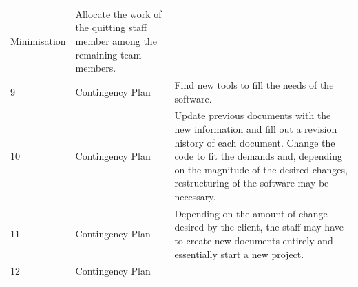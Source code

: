 \documentclass[]{article}
\begin{document}
\begin{longtable}[c]{@{}lll@{}}
\begin{minipage}[t]{0.30\columnwidth}
Minimisation
\end{minipage} & \begin{minipage}[t]{0.30\columnwidth}\raggedright
Allocate the work of the quitting staff member among the remaining team
members.
\end{minipage}
\\\addlinespace
\begin{minipage}[t]{0.30\columnwidth}\raggedright
9
\end{minipage} & \begin{minipage}[t]{0.30\columnwidth}\raggedright
Contingency Plan
\end{minipage} & \begin{minipage}[t]{0.30\columnwidth}\raggedright
Find new tools to fill the needs of the software.
\end{minipage}
\\\addlinespace
\begin{minipage}[t]{0.30\columnwidth}\raggedright
10
\end{minipage} & \begin{minipage}[t]{0.30\columnwidth}\raggedright
Contingency Plan
\end{minipage} & \begin{minipage}[t]{0.30\columnwidth}\raggedright
Update previous documents with the new information and fill out a
revision history of each document. Change the code to fit the demands
and, depending on the magnitude of the desired changes, restructuring of
the software may be necessary.
\end{minipage}
\\\addlinespace
\begin{minipage}[t]{0.30\columnwidth}\raggedright
11
\end{minipage} & \begin{minipage}[t]{0.30\columnwidth}\raggedright
Contingency Plan
\end{minipage} & \begin{minipage}[t]{0.30\columnwidth}\raggedright
Depending on the amount of change desired by the client, the staff may
have to create new documents entirely and essentially start a new
project.
\end{minipage}
\\\addlinespace
\begin{minipage}[t]{0.30\columnwidth}\raggedright
12
\end{minipage} & \begin{minipage}[t]{0.30\columnwidth}\raggedright
Contingency Plan
\end{minipage} & \begin{minipage}[t]{0.30\columnwidth}\raggedright

\end{minipage}
\end{longtable}
\end{document}
